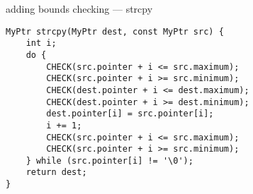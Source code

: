 \begin{frame}[fragile,label=wrappedPtrStrcpy]{adding bounds checking --- strcpy}
\lstset{
    language=C,
    style=small
}
\begin{lstlisting}
MyPtr strcpy(MyPtr dest, const MyPtr src) {
    int i;
    do {
        CHECK(src.pointer + i <= src.maximum);
        CHECK(src.pointer + i >= src.minimum);
        CHECK(dest.pointer + i <= dest.maximum);
        CHECK(dest.pointer + i >= dest.minimum);
        dest.pointer[i] = src.pointer[i];
        i += 1;
        CHECK(src.pointer + i <= src.maximum);
        CHECK(src.pointer + i >= src.minimum);
    } while (src.pointer[i] != '\0');
    return dest;
}
\end{lstlisting}
\end{frame}


